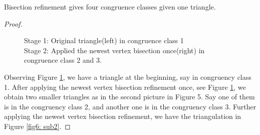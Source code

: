     \begin{lemma}
    Bisection refinement gives four congruence classes given one triangle.
    \label{lma6}
    \end{lemma}
    \begin{proof}
    \begin{figure}[h!]
    \centering
    \captionsetup{justification=centering}
    \caption{Stage 1: Original triangle(left) in congruence class 1\\Stage 2: Applied the newest vertex bisection once(right) in congruence class 2 and 3.}
    \label{fig6: sub1}
    \end{figure}

    Observing Figure \ref{fig6: sub1}, we have a triangle at the beginning, say in congruency class 1. After applying the newest vertex bisection refinement once, see Figure \ref{fig6: sub1}, we obtain two smaller triangles as in the second picture in Figure 5. Say one of them is in the congruency class 2, and another one is in the congruency class 3. Further applying the newest vertex bisection refinement, we have the triangulation in Figure \ref{fig6: sub2}.


\end{proof}

